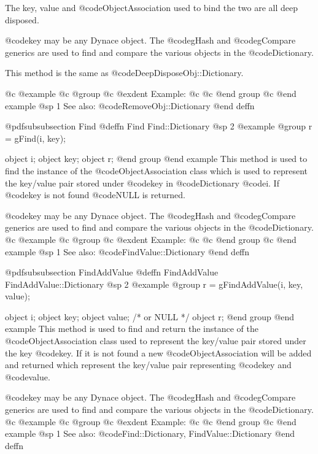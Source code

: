 The key, value and @code{ObjectAssociation} used to bind the two are all deep
disposed.

@code{key} may be any Dynace object.  The @code{gHash} and
@code{gCompare} generics are used to find and compare the various
objects in the @code{Dictionary}.

This method is the same as @code{DeepDisposeObj::Dictionary}.

@c @example
@c @group
@c @exdent Example:
@c 
@c @end group
@c @end example
@sp 1
See also:  @code{RemoveObj::Dictionary}
@end deffn














@pdfsubsubsection {Find}
@deffn {Find} Find::Dictionary
@sp 2
@example
@group
r = gFind(i, key);

object  i;
object  key;
object  r;
@end group
@end example
This method is used to find the instance of the @code{ObjectAssociation} class
which is used to represent the key/value pair stored under @code{key} in
@code{Dictionary} @code{i}.  If @code{key} is not found @code{NULL} is returned.

@code{key} may be any Dynace object.  The @code{gHash} and
@code{gCompare} generics are used to find and compare the various
objects in the @code{Dictionary}.
@c @example
@c @group
@c @exdent Example:
@c 
@c @end group
@c @end example
@sp 1
See also:  @code{FindValue::Dictionary}
@end deffn










@pdfsubsubsection {FindAddValue}
@deffn {FindAddValue} FindAddValue::Dictionary
@sp 2
@example
@group
r = gFindAddValue(i, key, value);

object  i;
object  key;
object  value;    /*  or NULL   */
object  r;
@end group
@end example
This method is used to find and return the instance of the
@code{ObjectAssociation} class used to represent the key/value pair stored
under the key @code{key}.  If it is not found a new @code{ObjectAssociation} will be
added and returned which represent the key/value pair representing
@code{key} and @code{value}.

@code{key} may be any Dynace object.  The @code{gHash} and
@code{gCompare} generics are used to find and compare the various
objects in the @code{Dictionary}.
@c @example
@c @group
@c @exdent Example:
@c 
@c @end group
@c @end example
@sp 1
See also:  @code{Find::Dictionary, FindValue::Dictionary}
@end deffn









